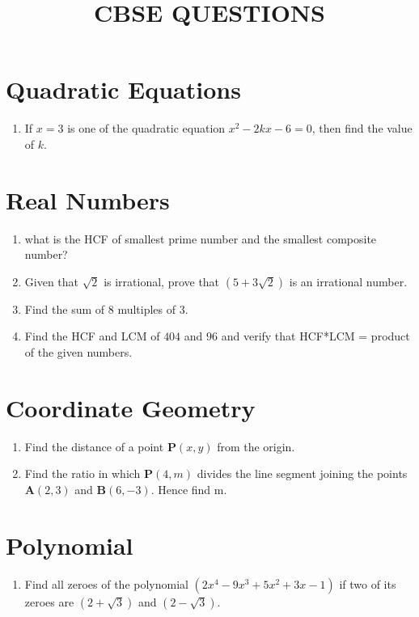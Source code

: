 \documentclass{article}
\let\vec\mathbf
\providecommand{\brak}[1]{\ensuremath{\left(#1\right)}}
\begin{document}
\title{\textbf{CBSE QUESTIONS}}
\date{}
\maketitle
		\section{Quadratic Equations}
		\begin{enumerate}[label=(\roman*)]
\item If $x=3$ is one of the quadratic equation $x^2-2kx-6= 0$, then find the value of $k$.
		\end{enumerate}
	\section{Real Numbers}
		\begin{enumerate}[label=(\roman*)]
	\item what is the HCF of smallest prime number and the smallest composite number?
	\item Given that $\sqrt{2}$ is irrational, prove that $\brak{5+3\sqrt2}$ is an irrational number.
	\item Find the sum of $8$ multiples of $3$.
	\item Find the HCF and LCM of $404$ and $96$ and verify that HCF*LCM = product of the given numbers.
		\end{enumerate}
		\section{Coordinate Geometry}
		\begin{enumerate}[label=(\roman*)]
			\item Find the distance of a point $\vec{P}(x,y)$ from the origin.
			\item Find the ratio in which $\vec{P}(4,m)$ divides the line segment joining the points $\vec{A}(2,3)$ and $\vec{B}(6,-3)$. Hence find m.
		\end{enumerate}
		\section{Polynomial}
		\begin{enumerate}[label=(\roman*)]
			\item Find all zeroes of the polynomial $\brak{2x^4-9x^3+5x^2+3x-1}$ if two of its zeroes are $\brak{2+\sqrt3}$ and $\brak{2-\sqrt3}$.
		\end{enumerate}
\end{document}

